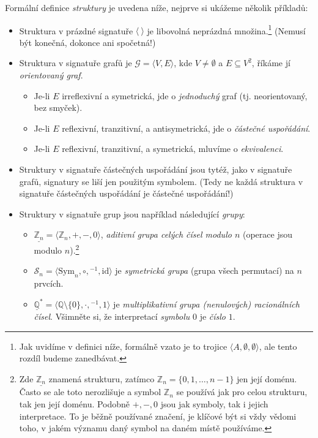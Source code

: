 \begin{example} \label{example:signatures}
    Formální definice \emph{struktury} je uvedena níže, nejprve si ukážeme několik příkladů:
\begin{itemize}
    \item Struktura v prázdné signatuře $\langle\ \rangle$ je libovolná neprázdná množina.\footnote{Jak uvidíme v definici níže, formálně vzato je to trojice $\langle A,\emptyset,\emptyset\rangle$, ale tento rozdíl budeme zanedbávat.} (Nemusí být konečná, dokonce ani spočetná!)
    \item Struktura v signatuře grafů je $\mathcal G=\langle V,E\rangle$, kde $V\neq\emptyset$ a $E\subseteq V^2$, říkáme jí \emph{orientovaný graf}. 
    \begin{itemize}
        \item Je-li $E$ irreflexivní a symetrická, jde o \emph{jednoduchý} graf (tj. neorientovaný, bez smyček).
        \item Je-li $E$ reflexivní, tranzitivní, a antisymetrická, jde o \emph{částečné uspořádání}.
        \item Je-li $E$ reflexivní, tranzitivní, a symetrická, mluvíme o \emph{ekvivalenci}.
    \end{itemize}
    \item Struktury v signatuře částečných uspořádání jsou tytéž, jako v signatuře grafů, signatury se liší jen použitým symbolem. (Tedy ne každá struktura v signatuře částečných uspořádání je částečné uspořádání!)
    \item Struktury v signatuře grup jsou například následující \emph{grupy}:
    \begin{itemize}
        \item $\underline{\mathbb Z_n}=\langle\mathbb Z_n,+,-,0\rangle$, \emph{aditivní grupa celých čísel modulo $n$} (operace jsou modulo $n$).\footnote{Zde $\underline{\mathbb Z_n}$ znamená strukturu, zatímco $\mathbb Z_n=\{0,1,\dots,n-1\}$ jen její doménu. Často se ale toto nerozlišuje a symbol $\mathbb Z_n$ se používá jak pro celou strukturu, tak jen její doménu. Podobně $+,-,0$ jsou jak symboly, tak i jejich interpretace. To je běžně používané značení, je klíčové být si vždy vědomi toho, v jakém významu daný symbol na daném místě používáme.}
        \item $\mathcal S_n=\langle \mathrm{Sym}_n,\circ,{}^{-1},\mathrm{id}\rangle$ je \emph{symetrická grupa} (grupa všech permutací) na $n$ prvcích.
        \item $\underline{\mathbb Q}^*=\langle \mathbb Q\setminus\{0\},\cdot,{}^{-1},1\rangle$ je \emph{multiplikativní grupa (nenulových) racionálních čísel}. Všimněte si, že interpretací \emph{symbolu} $0$ je \emph{číslo} $1$.

\end{itemize}
\end{itemize}
\end{example}
